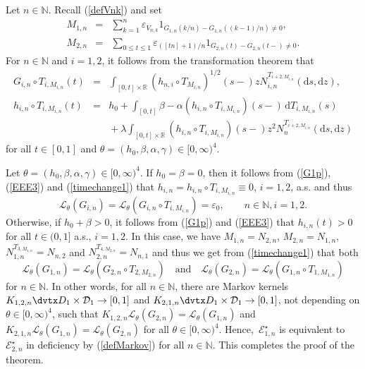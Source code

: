 \documentclass[number,citesort,seceqn,dvips]{arxbj}
\newcommand{\eqref}[1]{(\ref{#1})}
\newcommand{\RR}{\mathbb{R}}
\newcommand{\NN}{\mathbb{N}}
\newcommand{\DDD}{{\mathcal D}}
\newcommand{\EEE}{{\mathcal E}}
\newcommand{\LLL}{{\mathcal L}}
\begin{document}
Let $n\in\NN$. Recall \eqref{defVnk} and set
%
\begin{eqnarray*}
M_{1,n}&=&\sum_{k=1}^n
\varepsilon_{V_{n,k}} 1_{G_{1,n}(k/n)-G_{1,n}((k - 1)/n)\neq 0} ,\\
M_{2,n}&=&\sum_{0\le t\le1}
\varepsilon_{([tn]+1)/n} 1_{G_{2,n}(t)-G_{2,n}(t-)\neq0} .
\end{eqnarray*}
%
For $n\in\NN$ and $i=1,2$, it follows from the transformation theorem
that
%
\begin{eqnarray}\label{timechange1}
G_{i,n}\circ T_{i,M_{i,n}}(t)&=&\int_{[0,t]\times\RR}
(h_{n,i}\circ T_{M_{i,n}})^{1/2}(s-) z N_{i,n}^{T_{i+2,M_{i,n}}}(\mathrm{d}s,\mathrm{d}z),\nonumber \\
 h_{i,n}\circ
T_{i,M_{i,n}}(t)&=&h_0 + \int_{[0,t]} \beta - \alpha
(h_{i,n}\circ T_{i,M_{i,n}})(s-)\,\mathrm{d}T_{i,M_{i,n}}(s)\\
&&{} + \lambda\int_{[0,t]\times\RR}
(h_{i,n}\circ T_{i,M_{i,n}})(s-) z^2 N_n^{ T_{i+2,M_{i,n}}}(\mathrm{d}s,\mathrm{d}z)\nonumber
\end{eqnarray}
%
for all $t\in[0,1]$ and
$\theta=(h_0,\beta,\alpha,\gamma)\in[0,\infty)^4$.

Let $\theta=(h_0,\beta,\alpha,\gamma)\in[0,\infty)^4$. If
$h_0 = \beta = 0$, then it follows from \eqref{G1p}, \eqref{EEE3}
and \eqref{timechange1} that $h_{i,n}=h_{i,n}\circ T_{i,M_{i,n}}\equiv
0$, $i=1,2$, a.s. and thus
%
\[
\LLL_\theta(G_{i,n}) = \LLL_{\theta}(G_{i,n}\circ
T_{i,M_{i,n}}) = \varepsilon_0,\qquad  n\in\NN , i=1,2 .
\]
%
Otherwise, if $h_0+\beta>0$, it follows from \eqref{G1p} and
\eqref{EEE3} that $h_{i,n}(t)>0$ for all $t\in(0,1]$ a.s., $i=1,2$. In
this case, we have $M_{1,n} = N_{2,n}$, $M_{2,n} = N_{1,n}$,
$N_{1,n}^{T_{3,M_{1,n}}} = N_{n,2}$ and
$N_{2,n}^{T_{4,M_{2,n}}} = N_{n,1}$ and thus we get from
\eqref{timechange1} that both
%
\[
\LLL_\theta(G_{1,n}) = \LLL_{\theta}(G_{2,n}\circ
T_{2,M_{2,n}}) \quad\mbox{and}\quad
\LLL_\theta(G_{2,n})=\LLL_{\theta}(G_{1,n}\circ T_{1,M_{1,n}})
\]
%
for
$n\in\NN$. In other words, for all $n\in\NN$, there are Markov kernels
$K_{1,2,n}\dvtx D_1\times\DDD_1\to[0,1]$ and $K_{2,1,n}\dvtx D_1\times\DDD
_1\to
[0,1]$, not depending on $\theta\in[0,\infty)^4$, such that
$K_{1,2,n}\LLL_\theta(G_{2,n})=\LLL_\theta(G_{1,n})$ and
$K_{2,1,n}\LLL_\theta(G_{1,n}) = \LLL_\theta(G_{2,n})$ for all
$\theta\in[0,\infty)^4$. Hence,~$\EEE_{1,n}^{\star}$ is equivalent to~$\EEE_{2,n}^{\star}$ in deficiency by \eqref{defMarkov} for all
$n\in\NN$. This completes the proof of the theorem.

%
\end{document}
